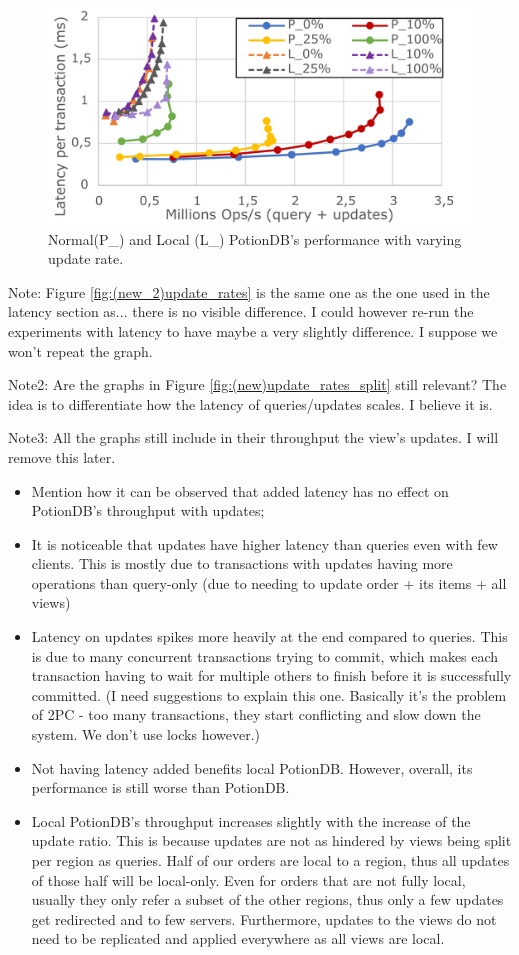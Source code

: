 \documentclass[sigplan,10pt]{acmart}
\begin{document}
\begin{figure}[h]
	\centering
	\includegraphics[width=.7\linewidth]{updRate_localvsglobal_cut}
	\caption{Normal(P\_) and Local (L\_) PotionDB's performance with varying update rate.}
	\label{fig:(new)update_rates_normal_vs_local}
\end{figure}

Note: Figure \ref{fig:(new_2)update_rates} is the same one as the one used in the latency section as... there is no visible difference.
I could however re-run the experiments with latency to have maybe a very slightly difference. I suppose we won't repeat the graph.

Note2: Are the graphs in Figure \ref{fig:(new)update_rates_split} still relevant? The idea is to differentiate how the latency of queries/updates scales. I believe it is.

Note3: All the graphs still include in their throughput the view's updates. I will remove this later.

\begin{itemize}
	\item Mention how it can be observed that added latency has no effect on PotionDB's throughput with updates;
	\item It is noticeable that updates have higher latency than queries even with few clients. This is mostly due to transactions with updates having more operations than query-only (due to needing to update order + its items + all views)
	\item Latency on updates spikes more heavily at the end compared to queries. This is due to many concurrent transactions trying to commit, which makes each transaction having to wait for multiple others to finish before it is successfully committed. (I need suggestions to explain this one. Basically it's the problem of 2PC - too many transactions, they start conflicting and slow down the system. We don't use locks however.)
	\item Not having latency added benefits local PotionDB. However, overall, its performance is still worse than PotionDB.
	\item Local PotionDB's throughput increases slightly with the increase of the update ratio. This is because updates are not as hindered by views being split per region as queries. Half of our orders are local to a region, thus all updates of those half will be local-only. Even for orders that are not fully local, usually they only refer a subset of the other regions, thus only a few updates get redirected and to few servers. Furthermore, updates to the views do not need to be replicated and applied everywhere as all views are local.
\end{itemize}
\end{document}
